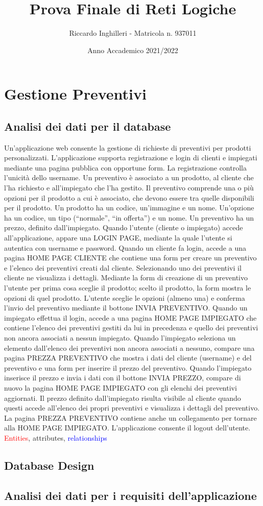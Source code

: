 \documentclass[a4paper, 11pt]{article}
\title{Prova Finale di Reti Logiche}
\author{Riccardo Inghilleri - Matricola n. 937011}
\date{Anno Accademico 2021/2022}
\begin{document}

\tableofcontents
\newpage
\section{Gestione Preventivi}
\subsection{Analisi dei dati per il database}
Un’applicazione web consente la gestione di richieste di preventivi per prodotti personalizzati. L’applicazione supporta registrazione e login di clienti e impiegati mediante una pagina pubblica con opportune form. La registrazione controlla l’unicità dello username. Un preventivo è associato a un prodotto, al cliente che l’ha richiesto e all’impiegato che l’ha gestito. Il preventivo comprende una o più opzioni per il prodotto a cui è associato, che devono essere tra quelle disponibili per il prodotto. Un prodotto ha un codice, un’immagine e un nome. Un’opzione ha un codice, un tipo (“normale”, “in offerta”) e un nome. Un preventivo ha un prezzo, definito dall’impiegato. Quando l’utente (cliente o impiegato) accede all’applicazione, appare una LOGIN PAGE, mediante la quale l’utente si autentica con username e password. Quando un cliente fa login, accede a una pagina HOME PAGE CLIENTE che contiene una form per creare un preventivo e l’elenco dei preventivi creati dal cliente. Selezionando uno dei preventivi il cliente ne visualizza i dettagli. Mediante la form di creazione di un preventivo l’utente per prima cosa sceglie il prodotto; scelto il prodotto, la form mostra le opzioni di quel prodotto. L’utente sceglie le opzioni (almeno una) e conferma l’invio del preventivo mediante il bottone INVIA PREVENTIVO. Quando un impiegato effettua il login, accede a una pagina HOME PAGE IMPIEGATO che contiene l’elenco dei preventivi gestiti da lui in precedenza e quello dei preventivi non ancora associati a nessun impiegato. Quando l’impiegato seleziona un elemento dall’elenco dei preventivi non ancora associati a nessuno, compare una pagina PREZZA PREVENTIVO che mostra i dati del cliente (username) e del preventivo e una form per inserire il prezzo del preventivo. Quando l’impiegato inserisce il prezzo e invia i dati con il bottone INVIA PREZZO, compare di nuovo la pagina HOME PAGE IMPIEGATO con gli elenchi dei preventivi aggiornati. Il prezzo definito dall’impiegato risulta visibile al cliente quando questi accede all’elenco dei propri preventivi e visualizza i dettagli del preventivo. La pagina PREZZA PREVENTIVO contiene anche un collegamento per tornare alla HOME PAGE IMPIEGATO. L’applicazione consente il logout dell’utente.\\

\noindent \textcolor{red}{Entities}, \textcolor{myGreen}{attributes}, \textcolor{blue}{relationships}
\subsection{Database Design}
\subsection{Analisi dei dati per i requisiti dell'applicazione}
\end{document}
